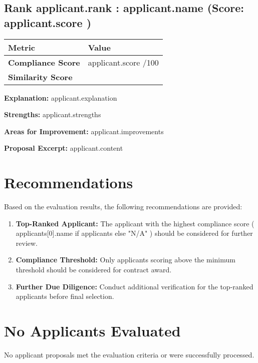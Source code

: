 \documentclass[12pt,a4paper]{article}
\begin{document}
{{%
\subsection*{Rank {{ applicant.rank }}: {{ applicant.name }} (Score: {{ applicant.score }})}

\begin{table}[H]
\centering
\begin{tabularx}{\textwidth}{|>{\bfseries}l|X|}
\hline
\rowcolor{lightgray}
Metric & Value \\
\hline
Compliance Score & {{ applicant.score }}/100 \\
Similarity Score & {{ "%
\hline
\end{tabularx}
\end{table}

\textbf{Explanation:} {{ applicant.explanation }}

\textbf{Strengths:} {{ applicant.strengths }}

\textbf{Areas for Improvement:} {{ applicant.improvements }}

\textbf{Proposal Excerpt:} {{ applicant.content }}

\newpage
{%

\section*{Recommendations}

Based on the evaluation results, the following recommendations are provided:

\begin{enumerate}
    \item \textbf{Top-Ranked Applicant:} The applicant with the highest compliance score ({{ applicants[0].name if applicants else "N/A" }}) should be considered for further review.
    \item \textbf{Compliance Threshold:} Only applicants scoring above the minimum threshold should be considered for contract award.
    \item \textbf{Further Due Diligence:} Conduct additional verification for the top-ranked applicants before final selection.
\end{enumerate}
{%
\section*{No Applicants Evaluated}
No applicant proposals met the evaluation criteria or were successfully processed.
{%

}}}}}
\end{document}
